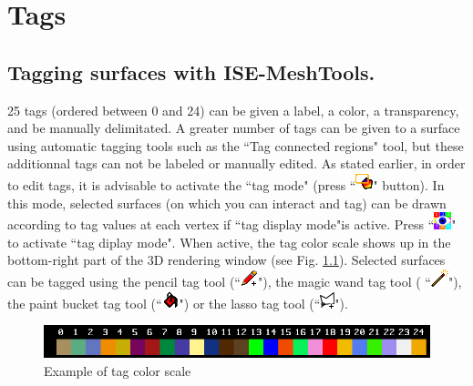 
\chapter{Tags}\label{tags_chapter}
\minitoc 
\section{Tagging surfaces with ISE-MeshTools.}
25 tags (ordered between 0 and 24) can be given
a label, a color, a transparency, and be manually
delimitated. A greater number of tags can be given
to a surface using automatic tagging tools such as the ``Tag connected regions" tool, but these
additionnal tags can not be labeled or manually edited. As stated earlier, in order to edit tags, it is advisable to activate the ``tag mode" (press ``\includegraphics[scale=0.7]{images/pixmap/Tag_select_mode.png}" button). In this mode, selected surfaces (on which you can interact and tag) can be drawn according to tag values at each vertex if ``tag display mode"is active. Press ``\includegraphics[scale=0.7]{images/pixmap/Show_Tag_Window.png}" to activate ``tag diplay mode". When active, the tag color scale shows up in the bottom-right part of the 3D rendering window (see Fig. \ref{tag_color_scale}). Selected surfaces can be tagged using the pencil tag tool (``\includegraphics[scale=0.7]{images/pixmap/pencil.png}"), the magic wand tag tool ( ``\includegraphics[scale=0.7]{images/pixmap/magic_wand.png}"), the paint bucket tag tool (``\includegraphics[scale=0.7]{images/pixmap/Flood_fill.png}") or the lasso tag tool (``\includegraphics[scale=0.7]{images/pixmap/Lasso_plus.png}").

\begin{figure}
  \centering
  \includegraphics[scale=0.5]{images/Tags/Tag_color_scale.png} 
	\caption{Example of tag color scale}
\label{tag_color_scale}
 
\end{figure}



